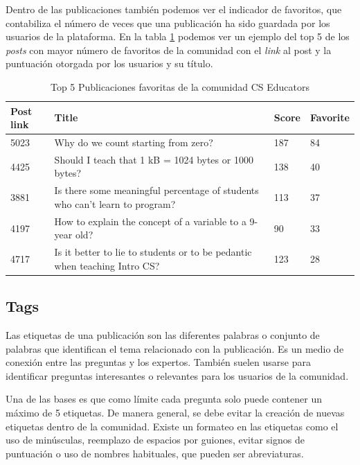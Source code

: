\documentclass[a4paper, 12pt]{book}
\begin{document}
Dentro de las publicaciones también podemos ver el indicador de favoritos, que contabiliza el número de veces que una publicación ha sido guardada por los usuarios de la plataforma. En la tabla \ref{table:top_5_cseducators} podemos ver un ejemplo del top 5 de los \emph{posts} con mayor número de favoritos de la comunidad con el \emph{link} al post y la puntuación otorgada por los usuarios y su título. 
\begin{table}[ht]
\centering
    \begin{tabular}{@{} p{2cm} p{6cm} p{1cm} p{2cm} @{}}
        \hline
        Post link & Title & Score & Favorite \\
        \hline
        5023 & Why do we count starting from zero? & 187 & 84 \\ 
        4425 & Should I teach that 1 kB = 1024 bytes or 1000 bytes?  & 138 & 40 \\ 
        3881 & Is there some meaningful percentage of students who can't learn to program? & 113 & 37 \\ 
        4197 & How to explain the concept of a variable to a 9-year old? & 90 & 33 \\ 
        4717 & Is it better to lie to students or to be pedantic when teaching Intro CS? & 123 & 28 \\ 
        \hline
    \end{tabular}
\caption{Top 5 Publicaciones favoritas de la comunidad CS Educators}
\label{table:top_5_cseducators}
\end{table}


%
%

\subsection{Tags}

Las etiquetas de una publicación son las diferentes palabras o conjunto de palabras que identifican el tema relacionado con la publicación. Es un medio de conexión entre las preguntas y los expertos. También suelen usarse para identificar preguntas interesantes o relevantes para los usuarios de la comunidad. 

Una de las bases es que como límite cada pregunta solo puede contener un máximo de 5 etiquetas. De manera general, se debe evitar la creación de nuevas etiquetas dentro de la comunidad. Existe un formateo en las etiquetas como el uso de minúsculas, reemplazo de espacios por guiones, evitar signos de puntuación o uso de nombres habituales, que pueden ser abreviaturas.
\end{document}
